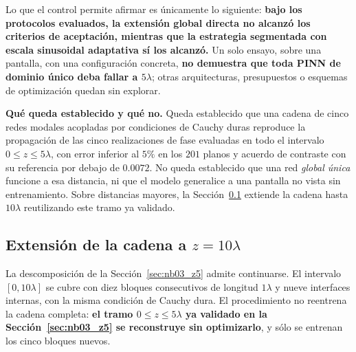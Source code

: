 Lo que el control permite afirmar es únicamente lo siguiente: \textbf{bajo los
protocolos evaluados, la extensión global directa no alcanzó los criterios de
aceptación, mientras que la estrategia segmentada con escala sinusoidal
adaptativa sí los alcanzó.} Un solo ensayo, sobre una pantalla, con una
configuración concreta, \textbf{no demuestra que toda PINN de dominio único
deba fallar a $5\lambda$}; otras arquitecturas, presupuestos o esquemas de
optimización quedan sin explorar.

\textbf{Qué queda establecido y qué no.} Queda establecido que una cadena de
cinco redes modales acopladas por condiciones de Cauchy duras reproduce la
propagación de las cinco realizaciones de fase evaluadas en todo el intervalo
$0\leq z\leq 5\lambda$, con error inferior al $5\%$ en los $201$ planos y
acuerdo de contraste con su referencia por debajo de $0.0072$. No queda
establecido que una red \emph{global única} funcione a esa distancia, ni que el
modelo generalice a una pantalla no vista sin entrenamiento. Sobre distancias
mayores, la Sección~\ref{sec:nb03_z10} extiende la cadena hasta $10\lambda$
reutilizando este tramo ya validado.

\subsection{Extensión de la cadena a \texorpdfstring{$z=10\lambda$}{z=10 lambda}}
\label{sec:nb03_z10}

La descomposición de la Sección~\ref{sec:nb03_z5} admite continuarse. El
intervalo $[0,10\lambda]$ se cubre con diez bloques consecutivos de longitud
$1\lambda$ y nueve interfaces internas, con la misma condición de Cauchy dura.
El procedimiento no reentrena la cadena completa: \textbf{el tramo
$0\leq z\leq 5\lambda$ ya validado en la Sección~\ref{sec:nb03_z5} se
reconstruye sin optimizarlo}, y sólo se entrenan los cinco bloques nuevos.

